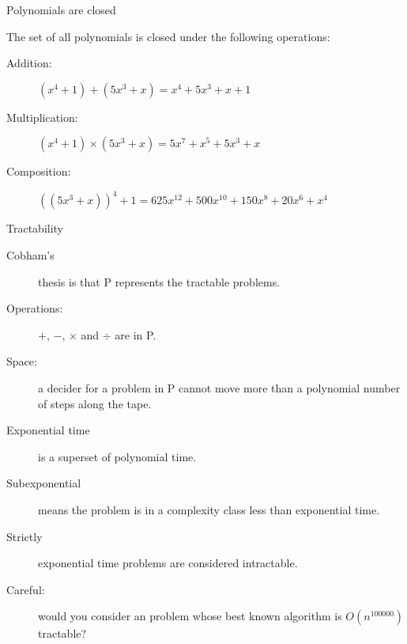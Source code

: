 \begin{frame}[fragile]{Polynomials are closed}
  
  
  The set of all polynomials is closed under the following operations:
  \begin{description}
    \item[Addition:] \( (x^4 + 1) + (5 x^3 + x) = x^4 + 5 x^3 + x + 1 \)
    \item[Multiplication:] \( (x^4 + 1) \times (5 x^3 + x) = 5 x^7 + x^5 + 5 x^3 + x \)
    \item[Composition:] \( ((5 x^3 + x))^4 + 1  = 625x^{12} + 500 x^{10} + 150x^8 + 20x^6 + x^4 \)
  \end{description}


\end{frame}


\begin{frame}{Tractability}
  
  \begin{description}
    \item[Cobham's] thesis is that P represents the tractable problems.
    \item[Operations:] $+$, $-$, $\times$ and $\div$ are in P.
    \item[Space:] a decider for a problem in P cannot move more than a polynomial number of steps along the tape.
    \item[Exponential time] is a superset of polynomial time.
    \item[Subexponential] means the problem is in a complexity class less than exponential time.
    \item[Strictly] exponential time problems are considered intractable.
    \item[Careful:] would you consider an problem whose best known algorithm is $O(n^{100000})$ tractable?
  \end{description}


\end{frame}

